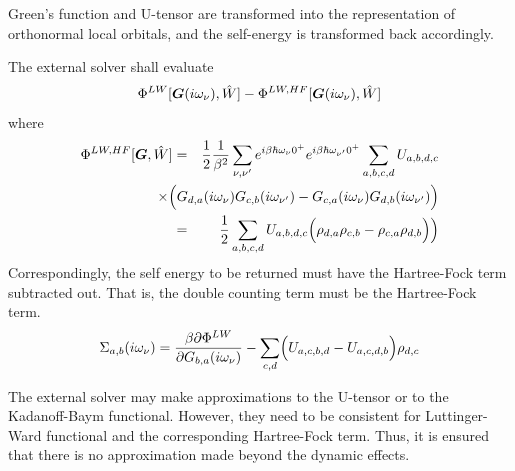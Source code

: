 \documentclass[11pt,a4paper]{report}
\begin{document}
\begin{enumerate}
Green's function and U-tensor are transformed into the representation
of orthonormal local orbitals, and the self-energy is transformed back
accordingly.

The external solver shall evaluate
\begin{eqnarray}
\Phi^{LW}[\bm{G}(i\omega_\nu),\hat{W}]
-\Phi^{LW,HF}[\bm{G}(i\omega_\nu),\hat{W}]
\end{eqnarray}
where
\begin{eqnarray}
  \Phi^{LW,HF}[\mat{G},\hat{W}]
  &=&
  \frac{1}{2}
  \frac{1}{\beta^{2}} 
  \sum_{\nu,\nu'} e^{i \beta \hbar \omega_\nu 0^{+}} e^{i \beta \hbar \omega_{\nu'} 0^{+}}
  \sum_{a,b,c,d}
  U_{a,b,d,c} 
  \nonumber\\ 
  &&\hspace{-1.2cm}\times\Big(
  G_{d,a}(i\omega_\nu)G_{c,b}(i\omega_{\nu'})
  -  G_{c,a}(i\omega_\nu)G_{d,b}(i\omega_{\nu'})
  \Big) 
\nonumber\\
&=& \frac{1}{2}
  \sum_{a,b,c,d}
  U_{a,b,d,c} \Bigl(
  \rho_{d,a}\rho_{c,b} -  \rho_{c,a}\rho_{d,b}\Bigr)
  \Big) 
\end{eqnarray}
Correspondingly, the self energy to be returned must have the
Hartree-Fock term subtracted out. That is, the double counting term
must be the Hartree-Fock term.
\begin{eqnarray*}
\Sigma_{a,b}(i\omega_\nu)=\frac{\beta\partial\Phi^{LW}}
{\partial G_{b,a}(i\omega_\nu)}-\sum_{c,d}\Bigl(U_{a,c,b,d}-U_{a,c,d,b}\Bigr)
\rho_{d,c}
\end{eqnarray*}

The external solver may make approximations to the U-tensor or to the
Kadanoff-Baym functional. However, they need to be consistent for
Luttinger-Ward functional and the corresponding Hartree-Fock
term. Thus, it is ensured that there is no approximation made beyond
the dynamic effects.


\end{enumerate}
\end{document}
